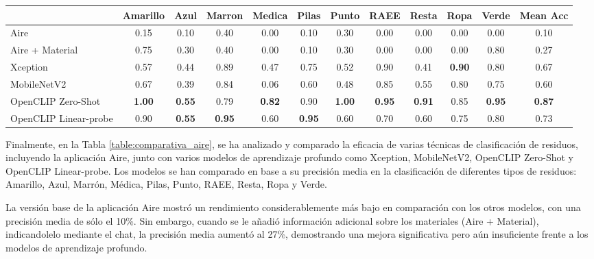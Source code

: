 \documentclass[10pt,a4paper,twocolumn,twoside]{article}
\begin{document}
\begin{table*}[h]
  \centering %
  \begin{tabular}{@{}l|cccccccccc|c@{}} %
  \toprule %
  & Amarillo & Azul & Marron & Medica & Pilas & Punto & RAEE & Resta & Ropa & Verde & Mean Acc \\
  \midrule %
  Aire & 0.15 & 0.10 & 0.40 & 0.00 & 0.10 & 0.30 & 0.00 & 0.00 & 0.00 & 0.00 & 0.10 \\
  Aire + Material & 0.75 & 0.30 & 0.40 & 0.00 & 0.10 & 0.30 & 0.00 & 0.00 & 0.00 & 0.80 & 0.27 \\
  \midrule
  Xception & 0.57 & 0.44 & 0.89 & 0.47 & 0.75 & 0.52 & 0.90 & 0.41 & \textbf{0.90} & 0.80 & 0.67 \\
  MobileNetV2 & 0.67 & 0.39 & 0.84 & 0.06 & 0.60 & 0.48 & 0.85 & 0.55 & 0.80 & 0.75 & 0.60 \\
  \midrule
  OpenCLIP Zero-Shot & \textbf{1.00} & \textbf{0.55} & 0.79 & \textbf{0.82} & 0.90 & \textbf{1.00} & \textbf{0.95} & \textbf{0.91} & 0.85 & \textbf{0.95} & \textbf{0.87} \\
  OpenCLIP Linear-probe & 0.90 & \textbf{0.55} & \textbf{0.95} & 0.60 & \textbf{0.95} & 0.60 & 0.70 & 0.60 & 0.75 & 0.80 & 0.73 \\
  \bottomrule %
  \end{tabular}
  \caption{Comparativa de los modelos desarrollados con la aplicación Aire con un dataset de Test. Por cada clase tenemos la siguiente cantidad de imágenes: Amarillo (21), Azul (18), Marrón (19), Medica (17), Pilas (20), Punto (21), RAEE (20), Resta (22), Ropa (20), Verde (20).}
  \label{table:comparativa_aire}

\end{table*}

Finalmente, en la Tabla \ref{table:comparativa_aire}, se ha analizado y comparado la eficacia de varias técnicas de clasificación de residuos, incluyendo la aplicación Aire, junto con varios modelos de aprendizaje profundo como Xception, MobileNetV2, OpenCLIP Zero-Shot y OpenCLIP Linear-probe. Los modelos se han comparado en base a su precisión media en la clasificación de diferentes tipos de residuos: Amarillo, Azul, Marrón, Médica, Pilas, Punto, RAEE, Resta, Ropa y Verde.

La versión base de la aplicación Aire mostró un rendimiento considerablemente más bajo en comparación con los otros modelos, con una precisión media de sólo el 10\%. Sin embargo, cuando se le añadió información adicional sobre los materiales (Aire + Material), indicandolelo mediante el chat, la precisión media aumentó al 27\%, demostrando una mejora significativa pero aún insuficiente frente a los modelos de aprendizaje profundo.
\end{document}
